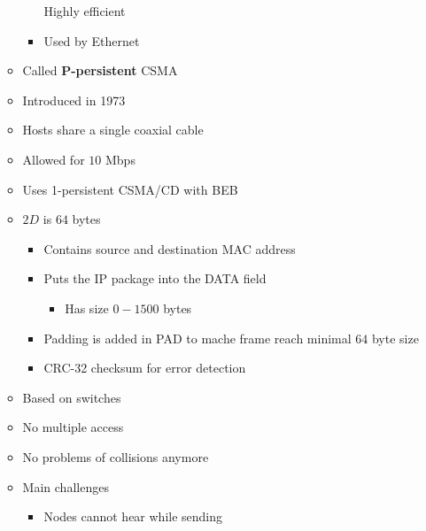 \begin{itemize}
\begin{itemize}
\begin{itemize}
                    \ipro Highly efficient
                    \item Used by Ethernet
                \end{itemize}
            \item Called \textbf{P-persistent} CSMA
        \end{itemize}
        \begin{itemize}
            \item Introduced in 1973
            \item Hosts share a single coaxial cable
            \item Allowed for $10$ Mbps
            \item Uses 1-persistent CSMA/CD with BEB
            \item $2D$ is $64$ bytes
                \begin{itemize}
                    \item Contains source and destination MAC address
                    \item Puts the IP package into the DATA field
                        \begin{itemize}
                            \item Has size $0 - 1500$ bytes
                        \end{itemize}
                    \item Padding is added in PAD to mache frame reach minimal $64$ byte size
                    \item CRC-32 checksum for error detection
                \end{itemize}
        \end{itemize}
        \begin{itemize}
            \item Based on switches
            \item No multiple access
            \item No problems of collisions anymore
        \end{itemize}
        \begin{itemize}
            \item Main challenges
                \begin{itemize}
                    \item Nodes cannot hear while sending
                        \begin{itemize}

\end{itemize}
\end{itemize}
\end{itemize}
\end{itemize}
